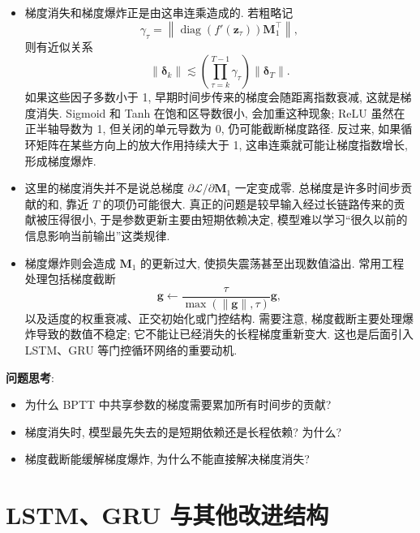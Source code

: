 \documentclass{../nndlcourse}
\begin{document}
\begin{enumerate}
\begin{itemize}
    \item 梯度消失和梯度爆炸正是由这串连乘造成的. 若粗略记
    \begin{equation*}
      \gamma_\tau
      =
      \left\|
      \operatorname{diag}\left(f'(\boldsymbol{z}_\tau)\right)
      \boldsymbol{M}_1^{\top}
      \right\|,
    \end{equation*}
    则有近似关系
    \begin{equation*}
      \|\boldsymbol{\delta}_k\|
      \lesssim
      \left(\prod_{\tau=k}^{T-1}\gamma_\tau\right)
      \|\boldsymbol{\delta}_T\|.
    \end{equation*}
    如果这些因子多数小于 1, 早期时间步传来的梯度会随距离指数衰减, 这就是梯度消失. Sigmoid 和 Tanh 在饱和区导数很小, 会加重这种现象; ReLU 虽然在正半轴导数为 1, 但关闭的单元导数为 0, 仍可能截断梯度路径. 反过来, 如果循环矩阵在某些方向上的放大作用持续大于 1, 这串连乘就可能让梯度指数增长, 形成梯度爆炸.

    \item 这里的梯度消失并不是说总梯度 $\partial\mathcal{L}/\partial \boldsymbol{M}_1$ 一定变成零. 总梯度是许多时间步贡献的和, 靠近 $T$ 的项仍可能很大. 真正的问题是较早输入经过长链路传来的贡献被压得很小, 于是参数更新主要由短期依赖决定, 模型难以学习“很久以前的信息影响当前输出”这类规律.
    \item 梯度爆炸则会造成 $\boldsymbol{M}_1$ 的更新过大, 使损失震荡甚至出现数值溢出. 常用工程处理包括梯度截断
    \begin{equation*}
      \boldsymbol{g}
      \leftarrow
      \frac{\tau}{\max(\|\boldsymbol{g}\|,\tau)}\boldsymbol{g},
    \end{equation*}
    以及适度的权重衰减、正交初始化或门控结构. 需要注意, 梯度截断主要处理爆炸导致的数值不稳定; 它不能让已经消失的长程梯度重新变大. 这也是后面引入 LSTM、GRU 等门控循环网络的重要动机.
  \end{itemize}

\end{enumerate}

\textbf{问题思考}:
\begin{itemize}
  \item 为什么 BPTT 中共享参数的梯度需要累加所有时间步的贡献?
  \item 梯度消失时, 模型最先失去的是短期依赖还是长程依赖? 为什么?
  \item 梯度截断能缓解梯度爆炸, 为什么不能直接解决梯度消失?
\end{itemize}

\section{LSTM、GRU 与其他改进结构}
\end{document}
